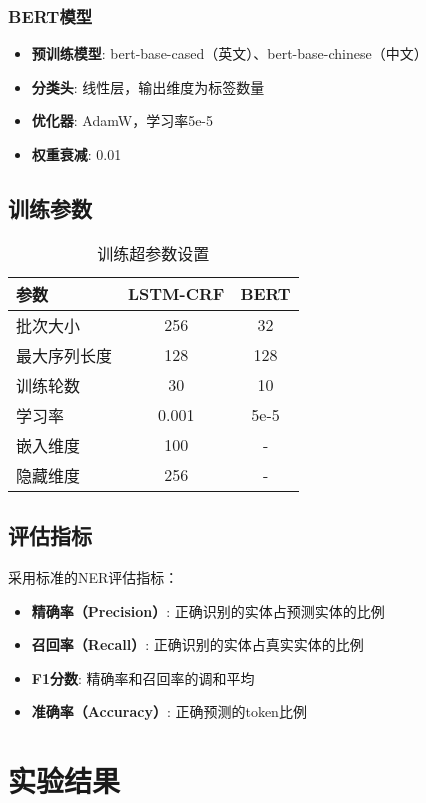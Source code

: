 \documentclass[12pt,a4paper]{article}
\begin{document}
\subsubsection{BERT模型}
\begin{itemize}
    \item \textbf{预训练模型}: bert-base-cased（英文）、bert-base-chinese（中文）
    \item \textbf{分类头}: 线性层，输出维度为标签数量
    \item \textbf{优化器}: AdamW，学习率5e-5
    \item \textbf{权重衰减}: 0.01
\end{itemize}

\subsection{训练参数}

\begin{table}[H]
\centering
\caption{训练超参数设置}
\begin{tabular}{lcc}
\toprule
参数 & LSTM-CRF & BERT \\
\midrule
批次大小 & 256 & 32 \\
最大序列长度 & 128 & 128 \\
训练轮数 & 30 & 10 \\
学习率 & 0.001 & 5e-5 \\
嵌入维度 & 100 & - \\
隐藏维度 & 256 & - \\
\bottomrule
\end{tabular}
\end{table}

\subsection{评估指标}

采用标准的NER评估指标：
\begin{itemize}
    \item \textbf{精确率（Precision）}: 正确识别的实体占预测实体的比例
    \item \textbf{召回率（Recall）}: 正确识别的实体占真实实体的比例
    \item \textbf{F1分数}: 精确率和召回率的调和平均
    \item \textbf{准确率（Accuracy）}: 正确预测的token比例
\end{itemize}

\section{实验结果}
\end{document}
